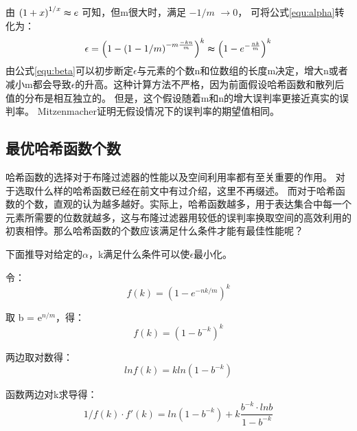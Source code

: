 由
\begin{math} \left(1 + x\right)^{{1/x}} \thickapprox e \end{math}
可知，但m很大时，满足
$-{1/m}$ $\to 0$，
可将公式\ref{equ:alpha}转化为：
\begin{equation}
\epsilon = \left(1 - \left(1 - {1/m}\right)^{{-m}\frac{-kn}{m}}\right)^k \thickapprox \left(1 - e^{-\frac{nk}{m}}\right)^k
\label{equ:beta}
\end{equation}
由公式\ref{equ:beta}可以初步断定\begin{math}\epsilon\end{math}与元素的个数n和位数组的长度m决定，增大n或者减小m都会导致\begin{math}\epsilon\end{math}的升高。这种计算方法不严格，因为前面假设哈希函数和散列后值的分布是相互独立的。
但是，这个假设随着m和n的增大误判率更接近真实的误判率。
Mitzenmacher证明无假设情况下的误判率的期望值相同\cite{mitzenmacher2002compressed}。

\subsection{最优哈希函数个数}
\label{sec:num_hashf}
哈希函数的选择对于布隆过滤器的性能以及空间利用率都有至关重要的作用。
对于选取什么样的哈希函数已经在前文中有过介绍，这里不再缀述。
而对于哈希函数的个数，直观的认为越多越好。实际上，哈希函数越多，用于表达集合中每一个元素所需要的位数就越多，这与布隆过滤器用较低的误判率换取空间的高效利用的初衷相悖。那么哈希函数的个数应该满足什么条件才能有最佳性能呢？

下面推导对给定的$\alpha$，k满足什么条件可以使$\epsilon$最小化。

令：
\begin{equation}
f\left(k\right) = \left(1 - e^{-{nk/m}}\right)^k 
\end{equation}

取 b = e$^{n/m}$，得：
\begin{equation}
f\left(k\right) = \left(1 - b^{-k}\right)^k 
\end{equation}

两边取对数得： 
\begin{equation}
lnf\left(k\right) = kln\left(1 - b^{-k}\right)
\end{equation}

函数两边对k求导得：
\begin{equation}
{1/f(k)}\cdot f'(k) = ln(1 - b^{-k}) + k \frac{b^{-k}\cdot lnb}{1 - b^{-k}} 
\label{equ:fk}
\end{equation}


